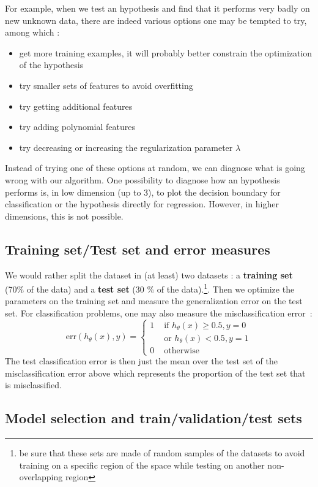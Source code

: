 \documentclass[10pt,a4paper]{article}
\begin{document}
For example, when we test an hypothesis and find that it performs very badly on new unknown data, there are indeed various options one may be tempted to try, among which :
\begin{itemize}
\item get more training examples, it will probably better constrain the optimization of the hypothesis
\item try smaller sets of features to avoid overfitting
\item try getting additional features
\item try adding polynomial features
\item try decreasing or increasing the regularization parameter $\lambda$
\end{itemize}
Instead of trying one of these options at random, we can diagnose what is going wrong with our algorithm. One possibility to diagnose how an hypothesis performs is, in low dimension (up to 3), to plot the decision boundary for classification or the hypothesis directly for regression. However, in higher dimensions, this is not possible. \\

\subsection{Training set/Test set and error measures}
We would rather split the dataset in (at least) two datasets : a \textbf{training set} (70\% of the data) and a \textbf{test set} (30 \% of the data).\footnote{be sure that these sets are made of random samples of the datasets to avoid training on a specific region of the space while testing on another non-overlapping region}. Then we optimize the parameters on the training set and measure the generalization error on the test set. For classification problems, one may also measure the misclassification error~:
\begin{equation}
\mbox{err}(h_\theta(x), y) = \begin{cases}
1 & \mbox{ if } h_\theta(x) \geq 0.5, y = 0\\
  & \mbox{ or } h_\theta(x) < 0.5, y = 1\\
0 & \mbox{ otherwise} 
\end{cases}
\end{equation}
The test classification error is then just the mean over the test set of the misclassification error above which represents the proportion of the test set that is misclassified.

\subsection{Model selection and train/validation/test sets}
\end{document}
